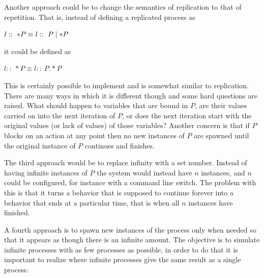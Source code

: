 	Another approach could be to change the semantics of replication
	to that of repetition. That is, instead of defining a replicated
	process as
	\begin{center}$l ::\ *P  \equiv l ::\ P \mid *P$\end{center}
	it could be defined as
	\begin{center}$l ::\ *P  \equiv l ::\ P .* P$\end{center}
	This is certainly possible to implement and is somewhat similar to 
	replication. There are many ways in which it is different though and
	some hard questions are raised. What should happen to variables that
	are bound in $P$, are their values carried on into the next iteration of 
	$P$, or does the next iteration start with the original values (or lack
	of values) of those variables? Another concern is that if $P$ blocks on
	an action at any point then no new instances of $P$ are spawned until the
	original instance of $P$ continues and finishes. 
		
	The third approach would be to replace infinity with a set number. Instead
	of having infinite instances of $P$ the system would instead have $n$ 
	instances, and $n$ could be configured, for instance with a command line 
	switch. The problem with this is that it turns a behavior that is supposed
	to continue forever into a behavior that ends at a particular time, that is 
	when all $n$ instances have finished.
	
	A fourth approach is to spawn new instances of the process only 
	when needed so that it appears as though there is an infinite amount. The 
	objective is to simulate infinite processes with as few processes as 
	possible, in order to do that it is important to realize where infinite 
	processes give the same result as a single process:
	
